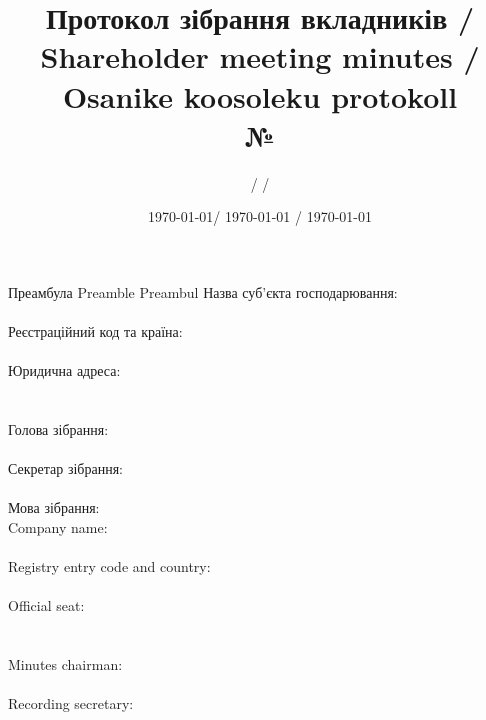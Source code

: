   \begin{Form}
    \title{Протокол зібрання вкладників / Shareholder meeting minutes / Osanike koosoleku protokoll\\№ }
    \author{ /  / }
    \date{\today / \textenglish{\today} / \textestonian{\today}}
    \maketitle
    \thispagestyle{fancy}

    \begin{paracol}{3}
      \clause %
        {Преамбула}
        {Preamble}
        {Preambul}
        { Назва суб’єкта господарювання:\\
          \\
          Реєстраційний код та країна:\\
          \\
          Юридична адреса:\\
          \\
          \\
          Голова зібрання:\\
          \\
          Секретар зібрання:\\
          \\
          Мова зібрання:\\
        }
        { Company name:\\
        \\
          Registry entry code and country:\\
          \\
          Official seat:\\
          \\
          \\
          Minutes chairman:\\
          \\
          Recording secretary:\\
}
\end{paracol}
\end{Form}
